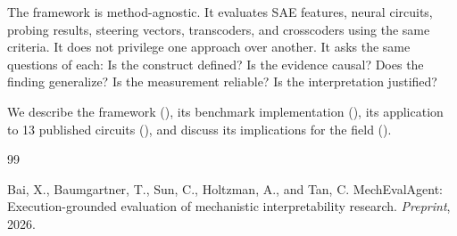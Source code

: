\documentclass[10pt]{article}
\begin{document}
The framework is method-agnostic. It evaluates SAE features, neural circuits, probing results, steering vectors, transcoders, and crosscoders using the same criteria. It does not privilege one approach over another. It asks the same questions of each: Is the construct defined? Is the evidence causal? Does the finding generalize? Is the measurement reliable? Is the interpretation justified?

We describe the framework (), its benchmark implementation (), its application to 13 published circuits (), and discuss its implications for the field ().






\begin{thebibliography}{99}

Bai, X., Baumgartner, T., Sun, C., Holtzman, A., and Tan, C.
\newblock MechEvalAgent: Execution-grounded evaluation of mechanistic interpretability research.
\newblock \emph{Preprint}, 2026.


\end{thebibliography}

\appendix

\end{document}
